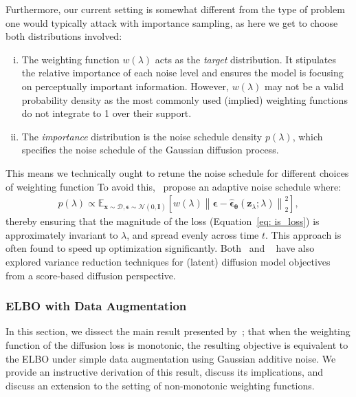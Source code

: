 Furthermore, our current setting is somewhat different from the type of problem one would typically attack with importance sampling, as here we get to choose both distributions involved:
%
\begin{enumerate}[(i)]
    \item The weighting function $w(\lambda)$ acts as the \textit{target} distribution. It stipulates the relative importance of each noise level and ensures the model is focusing on perceptually important information. However, $w(\lambda)$ may not be a valid probability density as the most commonly used (implied) weighting functions do not integrate to 1 over their support.
    \item The \textit{importance} distribution is the noise schedule density $p(\lambda)$, which specifies the noise schedule of the Gaussian diffusion process.
\end{enumerate}
%
This means we technically ought to retune the noise schedule for different choices of weighting function
To avoid this,~\cite{kingma2023understanding} propose an adaptive noise schedule where:
%
\begin{align}
    p(\lambda) \propto \mathbb{E}_{\mathbf{x} \sim \mathcal{D}, \boldsymbol{\epsilon} \sim \mathcal{N}(0, \mathbf{I})} \left[ w(\lambda) \left\| \boldsymbol{\epsilon} - \hat{\boldsymbol{\epsilon}}_{\boldsymbol{\theta}}(\mathbf{z}_\lambda; \lambda) \right\|^2_2 \right],
\end{align}
%
thereby ensuring that the magnitude of the loss (Equation~\ref{eq: is_loss}) is approximately invariant to $\lambda$, and spread evenly across time $t$. This approach is often found to speed up optimization significantly. Both~\cite{song2021maximum} and ~\cite{vahdat2021score} have also explored variance reduction techniques for (latent) diffusion model objectives from a score-based diffusion perspective.
%
\subsubsection{ELBO with Data Augmentation}
\label{subsubsec: elbo with data aug}
%
In this section, we dissect the main result presented by~\cite{kingma2023understanding}; that when the weighting function of the diffusion loss is monotonic, the resulting objective is equivalent to the ELBO under simple data augmentation using Gaussian additive noise. We provide an instructive derivation of this result, discuss its implications, and discuss an extension to the setting of non-monotonic weighting functions.

